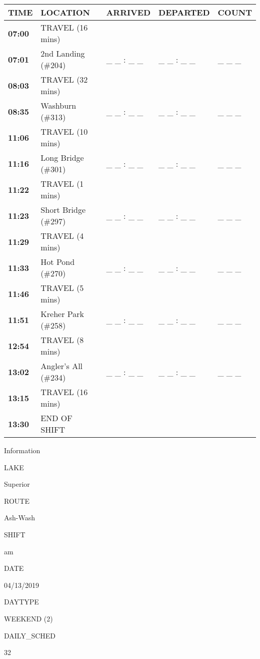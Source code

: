 \documentclass[]{article}
\begin{document}
\begin{tabular}{>{\bfseries}lllll}
\toprule
\textbf{TIME} & \textbf{LOCATION} & \textbf{ARRIVED} & \textbf{DEPARTED} & \textbf{COUNT}\\
\midrule
07:00 & TRAVEL (16 mins) &  &  & \\
07:01 & 2nd Landing (\#204) & \_ \_ : \_ \_ & \_ \_ : \_ \_ & \_ \_ \_\\
08:03 & TRAVEL (32 mins) &  &  & \\
08:35 & Washburn (\#313) & \_ \_ : \_ \_ & \_ \_ : \_ \_ & \_ \_ \_\\
11:06 & TRAVEL (10 mins) &  &  & \\
11:16 & Long Bridge (\#301) & \_ \_ : \_ \_ & \_ \_ : \_ \_ & \_ \_ \_\\
11:22 & TRAVEL (1 mins) &  &  & \\
11:23 & Short Bridge (\#297) & \_ \_ : \_ \_ & \_ \_ : \_ \_ & \_ \_ \_\\
11:29 & TRAVEL (4 mins) &  &  & \\
11:33 & Hot Pond (\#270) & \_ \_ : \_ \_ & \_ \_ : \_ \_ & \_ \_ \_\\
11:46 & TRAVEL (5 mins) &  &  & \\
11:51 & Kreher Park (\#258) & \_ \_ : \_ \_ & \_ \_ : \_ \_ & \_ \_ \_\\
12:54 & TRAVEL (8 mins) &  &  & \\
13:02 & Angler's All (\#234) & \_ \_ : \_ \_ & \_ \_ : \_ \_ & \_ \_ \_\\
13:15 & TRAVEL (16 mins) &  &  & \\
13:30 & END OF SHIFT &  &  & \\
\bottomrule
\end{tabular}\newpage

Information

LAKE

Superior

ROUTE

Ash-Wash

SHIFT

am

DATE

04/13/2019

DAYTYPE

WEEKEND (2)

DAILY\_SCHED

32

\vspace{24pt}
\end{document}

